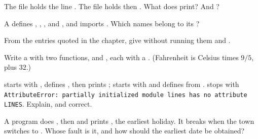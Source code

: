 \begin{exercise}[$\star$]\label{exo:g11:modules-and-interfaces:2}
The file  holds the line . The file  holds 
then . What does  print? And ?
\end{exercise}

\begin{exercise}[$\star$]\label{exo:g11:modules-and-interfaces:3}
A  defines , , ,  and , and imports .
Which names belong to its ?
\end{exercise}

\begin{exercise}[$\star$]\label{exo:g11:modules-and-interfaces:4}
From the entries quoted in the chapter, give without running them  and
.
\end{exercise}

\begin{exercise}[$\star$]\label{exo:g11:modules-and-interfaces:5}
Write a   with two functions,  and , each with a
. (Fahrenheit is Celsius times $9/5$, plus $32$.)
\end{exercise}

\begin{exercise}[$\star\star$]\label{exo:g11:modules-and-interfaces:6}
 starts with , defines , then prints
;  starts with  and defines  from
.  stops with
\texttt{AttributeError: partially initialized module \textquotesingle{}lines\textquotesingle{} has no attribute \textquotesingle{}LINES\textquotesingle{}}. Explain, and correct.
\end{exercise}

\begin{exercise}[$\star\star$]\label{exo:g11:modules-and-interfaces:7}
A program does , then  and prints
, the earliest holiday. It breaks when the town switches to . Whose fault is it,
and how should the earliest date be obtained?
\end{exercise}

